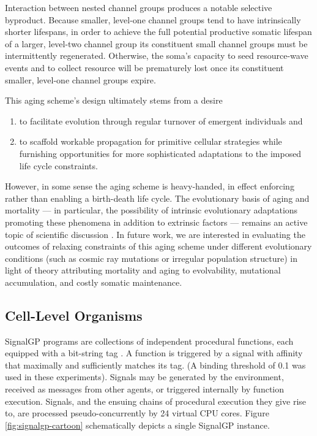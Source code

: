 Interaction between nested channel groups produces a notable selective byproduct.
Because smaller, level-one channel groups tend to have intrinsically shorter lifespans, in order to achieve the full potential productive somatic lifespan of a larger, level-two channel group its constituent small channel groups must be intermittently regenerated.
Otherwise, the soma's capacity to seed resource-wave events and to collect resource will be prematurely lost once its constituent smaller, level-one channel groups expire.

This aging scheme's design ultimately stems from a desire
\begin{enumerate}
\item to facilitate evolution through regular turnover of emergent individuals and
\item to scaffold workable propagation for primitive cellular strategies while furnishing opportunities for more sophisticated adaptations to the imposed life cycle constraints.
\end{enumerate}
However, in some sense the aging scheme is heavy-handed, in effect enforcing rather than enabling a birth-death life cycle.
The evolutionary basis of aging and mortality --- in particular, the possibility of intrinsic evolutionary adaptations promoting these phenomena in addition to extrinsic factors  --- remains an active topic of scientific discussion \cite{baig2014evolution}.
In future work, we are interested in evaluating the outcomes of relaxing constraints of this aging scheme under different evolutionary conditions (such as cosmic ray mutations or irregular population structure) in light of theory attributing mortality and aging to evolvability, mutational accumulation, and costly somatic maintenance.

\subsection{Cell-Level Organisms} \label{sup:cell_level_organisms}

SignalGP programs are collections of independent procedural functions, each equipped with a bit-string tag \cite{lalejini2018evolving}.
A function is triggered by a signal with affinity that maximally and sufficiently matches its tag.
(A binding threshold of 0.1 was used in these experiments).
Signals may be generated by the environment, received as messages from other agents, or triggered internally by function execution.
Signals, and the ensuing chains of procedural execution they give rise to, are processed pseudo-concurrently by 24 virtual CPU cores.
Figure \ref{fig:signalgp-cartoon} schematically depicts a single SignalGP instance.

